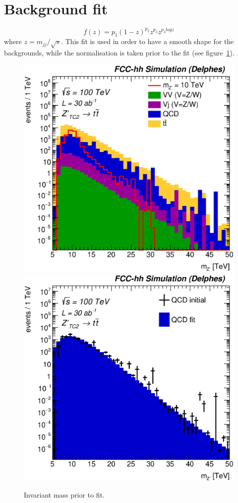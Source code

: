 \documentclass[a4paper,11pt]{article}
\begin{document}
\section{Background fit}%
\label{sec:app:bgfit}
\begin{equation}
f(z)=p_1(1-z)^{p_2}z^{p_3}z^{p_{4}logz}
\end{equation}
where $z=m_{jj}/\sqrt{s}$. This fit is used in order to have a smooth shape for the backgrounds, while the normalisation is taken prior to the fit (see figure~\ref{fig:hadronicresonances_nofit}).

\begin{figure}[!htb]\centering
\includegraphics[width=0.45\columnwidth]{Fig/Zptt/Mj1j2_pf08_MetCorr_sel8_nostack_log.eps}
\includegraphics[width=0.45\columnwidth]{Fig/Zptt/Zptt_QCD_sel8_Mj1j2_pf08_MetCorr_fit.eps}
\caption{Invariant mass prior to fit.}
\label{fig:hadronicresonances_nofit}
\end{figure}


\end{document}
